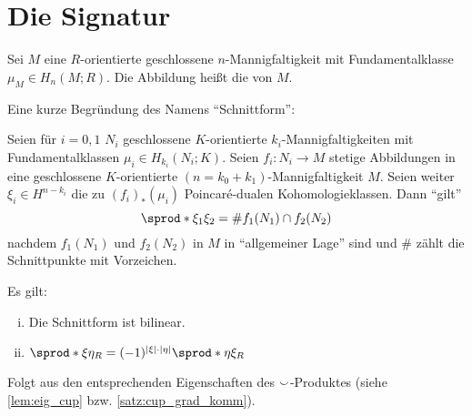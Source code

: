 \section{Die Signatur} %
\label{sec:10}

\begin{definition}[{name=[Schnittform]}]
	Sei $M$ eine $R$-orientierte geschlossene $n$-Mannigfaltigkeit mit Fundamentalklasse $\mu_M \in H_n(M;R)$.
	Die Abbildung
	heißt die  von $M$. 
\end{definition}

\begin{bemerkung}[{name=[Begründung des Namens \enquote{Schnittform}]}]
	Eine kurze Begründung des Namens \enquote{Schnittform}:
	
	Seien für $i=0,1$ $N_i$ geschlossene $K$-orientierte $k_i$-Mannigfaltigkeiten mit Fundamentalklassen $\mu_i \in H_{k_i}(N_i;K)$.
	Seien $f_i \colon N_i \to M$ stetige Abbildungen in eine geschlossene $K$-orientierte $(n=k_0+k_1)$-Mannigfaltigkeit $M$.
	Seien weiter $\xi_i \in H^{n-{k_i}}$ die zu $(f_i)_*(\mu_i)$ Poincaré-dualen Kohomologieklassen. Dann \enquote{gilt}
	\[
		\sprod*{\xi_1}{\xi_2} = \# f_1(N_1) \cap f_2(N_2)
	\]
	nachdem $f_1(N_1)$ und $f_2(N_2)$ in $M$ in \enquote{allgemeiner Lage} sind und $\#$ zählt die Schnittpunkte mit Vorzeichen.
\end{bemerkung}

\begin{lemma}[{name=[Schnittform ist bilinear und graduiert kommutativ]},label=lem:schnittform_bil_grad_komm]
	Es gilt:
	\begin{enumerate}[(i),itemsep=2pt]
		\item Die Schnittform ist bilinear.
		\item $\sprod*{\xi}{\eta}_R = (-1)^{\abs*{\xi}\cdot \abs*{\eta}} \sprod*{\eta}{\xi}_R$
	\end{enumerate}
\end{lemma}
\begin{beweis}
	Folgt aus den entsprechenden Eigenschaften des $\smallsmile$-Produktes (siehe \ref{lem:eig_cup} bzw. \ref{satz:cup_grad_komm}).
\end{beweis}

